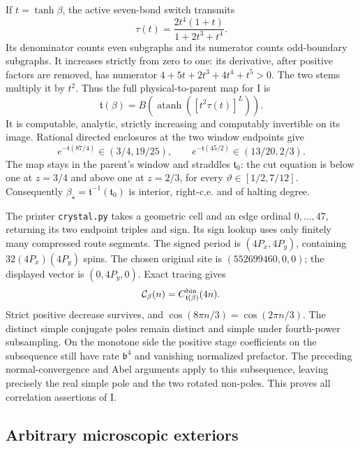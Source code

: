 If \(t=\tanh\beta\), the active seven-bond switch transmits
\begin{equation}\label{eq:diamond}
 \tau(t)=\frac{2t^4(1+t)}{1+2t^3+t^4}.
\end{equation}
Its denominator counts even subgraphs and its numerator counts odd-boundary subgraphs. It increases strictly from zero to one: its derivative, after positive factors are removed, has numerator \(4+5t+2t^3+4t^4+t^5>0\). The two stems multiply it by \(t^2\). Thus the full physical-to-parent map for I is
\begin{equation}\label{eq:crystal-map}
 \mathfrak t(\beta)=B\left(\operatorname{atanh}
       \left([t^2\tau(t)]^L\right)\right).
\end{equation}
It is computable, analytic, strictly increasing and computably invertible on its image. Rational directed enclosures at the two window endpoints give
\[
 e^{-\mathfrak t(87/4)}\in(3/4,19/25),\qquad
 e^{-\mathfrak t(45/2)}\in(13/20,2/3).
\]
The map stays in the parent's window and straddles \(\mathfrak t_0\): the cut equation is below one at \(z=3/4\) and above one at \(z=2/3\), for every \(\vartheta\in[1/2,7/12]\). Consequently
\(\beta_\star=\mathfrak t^{-1}(\mathfrak t_0)\) is interior, right-c.e. and of halting degree.

The printer \texttt{crystal.py} takes a geometric cell and an edge ordinal \(0,\ldots,47\), returning its two endpoint triples and sign. Its sign lookup uses only finitely many compressed route segments. The signed period is \((4P_x,4P_y)\), containing \(32(4P_x)(4P_y)\) spins. The chosen original site is \((552699460,0,0)\); the displayed vector is \((0,4P_y,0)\). Exact tracing gives
\begin{equation}\label{eq:sampling-four}
 \mathcal C_\beta(n)=C^{\rm bin}_{\mathfrak t(\beta)}(4n).
\end{equation}
Strict positive decrease survives, and \(\cos(8\pi n/3)=\cos(2\pi n/3)\). The distinct simple conjugate poles remain distinct and simple under fourth-power subsampling. On the monotone side the positive stage coefficients on the subsequence still have rate \(\mathfrak b^4\) and vanishing normalized prefactor. The preceding normal-convergence and Abel arguments apply to this subsequence, leaving precisely the real simple pole and the two rotated non-poles. This proves all correlation assertions of I.

\subsection{Arbitrary microscopic exteriors}\label{sec:collar}

